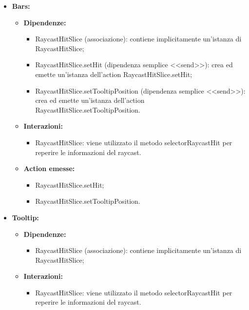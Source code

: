 \begin{itemize}
      \item \textbf{Bars:}
            \begin{itemize}
                  \item \textbf{Dipendenze:}
                        \begin{itemize}
                              \item RaycastHitSlice (associazione): contiene implicitamente un'istanza di
                                    RaycastHitSlice;
                              \item RaycastHitSlice.setHit (dipendenza semplice <<send>>): crea ed emette
                                    un'istanza dell'action RaycastHitSlice.setHit;
                              \item RaycastHitSlice.setTooltipPosition (dipendenza semplice <<send>>): crea ed
                                    emette un'istanza dell'action RaycastHitSlice.setTooltipPosition.
                        \end{itemize}
                  \item \textbf{Interazioni:}
                        \begin{itemize}
                              \item RaycastHitSlice: viene utilizzato il metodo selectorRaycastHit per reperire le
                                    informazioni del raycast.
                        \end{itemize}
                  \item \textbf{Action emesse:}
                        \begin{itemize}
                              \item RaycastHitSlice.setHit;
                              \item RaycastHitSlice.setTooltipPosition.
                        \end{itemize}
            \end{itemize}

      \item \textbf{Tooltip:}
            \begin{itemize}
                  \item \textbf{Dipendenze:}
                        \begin{itemize}
                              \item RaycastHitSlice (associazione): contiene implicitamente un'istanza di
                                    RaycastHitSlice;
                        \end{itemize}
                  \item \textbf{Interazioni:}
                        \begin{itemize}
                              \item RaycastHitSlice: viene utilizzato il metodo selectorRaycastHit per reperire le
                                    informazioni del raycast.
                        \end{itemize}
            \end{itemize}
\end{itemize}

